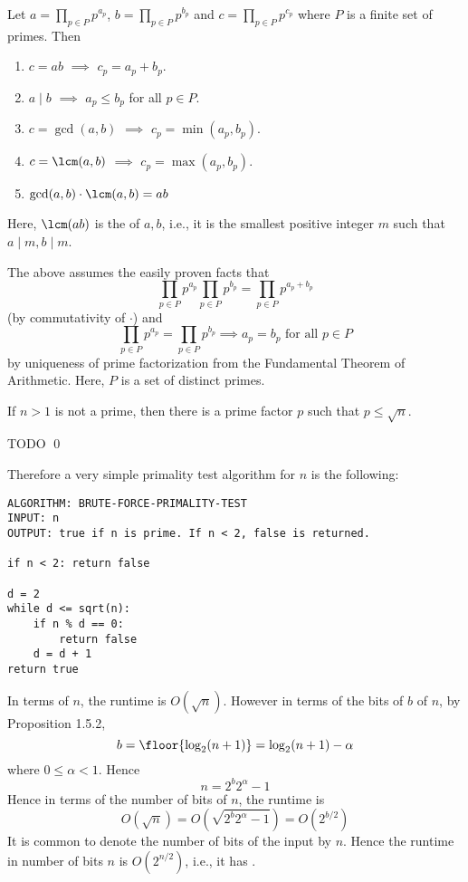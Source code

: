 \begin{prop} Let $a = \prod_{p \in P} p^{a_p}$, $b = \prod_{p
    \in P} p^{b_p}$ and $c = \prod_{p \in P} p^{c_p}$
  where $P$ is a finite set of primes. Then
\begin{enumerate}[nosep,label=\textnormal{(\alph*)}]
 \item $c = ab$ $\implies$ $c_p = a_p + b_p$.
 \item $a \mid b$ $\implies$ $a_p \leq b_p$ for all $p \in P$.
 \item $c = \gcd(a,b)$ $\implies$ $c_p = \min(a_p, b_p)$.
 \item $c = \lcm(a,b)$ $\implies$ $c_p = \max(a_p, b_p)$.
 \item $\gcd(a,b) \cdot \lcm(a,b) = ab$
\end{enumerate}
\end{prop}


Here, $\lcm(a b)$ is the  of $a,b$, i.e.,
it is the smallest positive integer $m$ such that $a \mid m, b\mid m$.

The above assumes the easily proven facts that
\[
\prod_{p \in P} p^{a_p}
\prod_{p \in P} p^{b_p}
=
\prod_{p \in P} p^{a_p + b_p}
\]
(by commutativity of $\cdot$) and
\[
\prod_{p \in P} p^{a_p}
=
\prod_{p \in P} p^{b_p}
\implies
a_p = b_p \text{ for all $p \in P$}
\]
by uniqueness of prime factorization from the Fundamental Theorem of Arithmetic.
Here, $P$ is a set of distinct primes.


\begin{prop}
  If $n > 1$ is not a prime, then there is a prime factor $p$ such that
  $p \leq \sqrt{n}$.
\end{prop}
\proof
TODO
\qed

Therefore a very simple primality test algorithm for $n$ is the following:
  
\begin{Verbatim}[fontsize=\footnotesize,frame=single]
ALGORITHM: BRUTE-FORCE-PRIMALITY-TEST
INPUT: n
OUTPUT: true if n is prime. If n < 2, false is returned.

if n < 2: return false

d = 2
while d <= sqrt(n):
    if n % d == 0:
        return false
    d = d + 1
return true
\end{Verbatim}

In terms of $n$, the runtime is $O(\sqrt{n})$.
However in terms of the bits of $b$ of $n$, by Proposition 1.5.2,
\[
b = \floor{\log_2 ( n + 1 )} = \log_2(n + 1) - \alpha
\]
where $0 \leq \alpha < 1$.
Hence
\[
n = 2^b2^\alpha - 1
\]
Hence in terms of the number of bits of $n$,
the runtime is
\[
O(\sqrt{n}) = O(\sqrt{2^b2^\alpha - 1}) = O(2^{b/2})
\]
It is common to denote the number of bits of the input by $n$.
Hence the runtime in number of bits $n$ is
$O(2^{n/2})$, i.e., it has .

